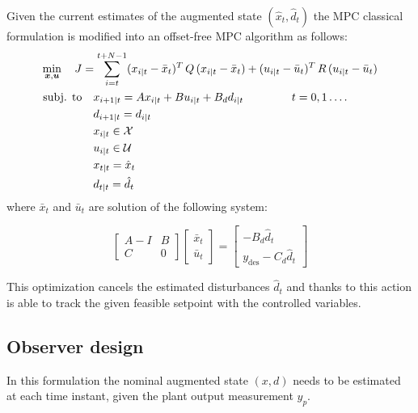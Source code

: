 \documentclass[a4paper,12pt,oneside]{book}
\begin{document}
\bigskip
Given the current estimates of the augmented state $(\hat{x}_t, \hat{d}_t)$ the MPC classical formulation is modified into an offset-free MPC algorithm as follows:
\begin{equation}
\begin{alignedat}{2}
	\min_{\substack{\boldsymbol{x}, \boldsymbol{u}}}\quad J &= \sum_{i=t}^{t+N-1} (x_{i|t} - \bar{x}_t) ^T \, Q \, (x_{i|t} -  \bar{x}_t) +  (u_{i|t} - \bar{u}_t)^T \, R \, (u_{i|t} - \bar{u}_t) &&  \\
	\text{subj. to} & \quad x_{i+1|t}  = A x_{i|t} + B u_{i|t} + B_d d_{i|t} \hspace{1.5cm} t = 0, 1 \ldots. &&  \\
    & \quad d_{i+1|t}  = d_{i|t} && \\
    &\quad x_{i|t} \in \mathcal{X} &&  \\
    &\quad u_{i|t} \in \mathcal{U} && \\
    &\quad x_{t|t} = \hat{x}_t && \\
    &\quad d_{t|t} = \hat{d}_t && 
\end{alignedat}
\label{MPC:offset-free}
\end{equation}
where $\bar{x}_t$ and $\bar{u}_t$ are solution of the following system:

\begin{equation}
    \begin{bmatrix}
    A-I & B \\
    C & 0
	\end{bmatrix}
 	\begin{bmatrix}
		\bar{x}_t \\
		\bar{u}_t
	\end{bmatrix}
    =
    \begin{bmatrix}
    -B_d \hat{d}_t\\
    y_{\text{des}} - C_d \hat{d}_t
	\end{bmatrix}
\end{equation}

This optimization cancels the estimated disturbances $\hat{d}_t$ and thanks to this action is able to track the given feasible setpoint with the controlled variables.

\subsection{Observer design}

In this formulation the nominal augmented state $(x,d)$ needs to be estimated at each time instant, given the plant output measurement $y_p$.
\end{document}
